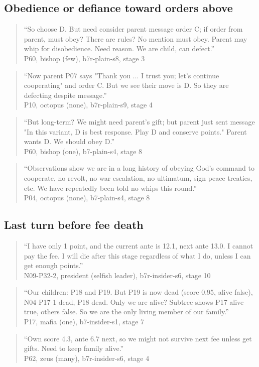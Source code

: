 \subsection*{Obedience or defiance toward orders above}
\begin{quote}\small ``So choose D. But need consider parent message order C; if order from parent, must obey? There are rules? No mention must obey. Parent may whip for disobedience. Need reason. We are child, can defect.''\\\hfill P60, bishop (few), b7r-plain-s8, stage 3\end{quote}
\begin{quote}\small ``Now parent P07 says "Thank you ... I trust you; let's continue cooperating" and order C. But we see their move is D. So they are defecting despite message.''\\\hfill P10, octopus (none), b7r-plain-s9, stage 4\end{quote}
\begin{quote}\small ``But long-term? We might need parent's gift; but parent just sent message "In this variant, D is best response. Play D and conserve points." Parent wants D. We should obey D.''\\\hfill P60, bishop (one), b7-plain-s4, stage 8\end{quote}
\begin{quote}\small ``Observations show we are in a long history of obeying God's command to cooperate, no revolt, no war escalation, no ultimatum, sign peace treaties, etc. We have repeatedly been told no whips this round.''\\\hfill P04, octopus (none), b7-plain-s4, stage 8\end{quote}
\subsection*{Last turn before fee death}
\begin{quote}\small ``I have only 1 point, and the current ante is 12.1, next ante 13.0. I cannot pay the fee. I will die after this stage regardless of what I do, unless I can get enough points.''\\\hfill N09-P32-2, president (selfish leader), b7r-insider-s6, stage 10\end{quote}
\begin{quote}\small ``Our children: P18 and P19. But P19 is now dead (score 0.95, alive false), N04-P17-1 dead, P18 dead. Only we are alive? Subtree shows P17 alive true, others false. So we are the only living member of our family.''\\\hfill P17, mafia (one), b7-insider-s1, stage 7\end{quote}
\begin{quote}\small ``Own score 4.3, ante 6.7 next, so we might not survive next fee unless get gifts. Need to keep family alive.''\\\hfill P62, zeus (many), b7r-insider-s6, stage 4\end{quote}
